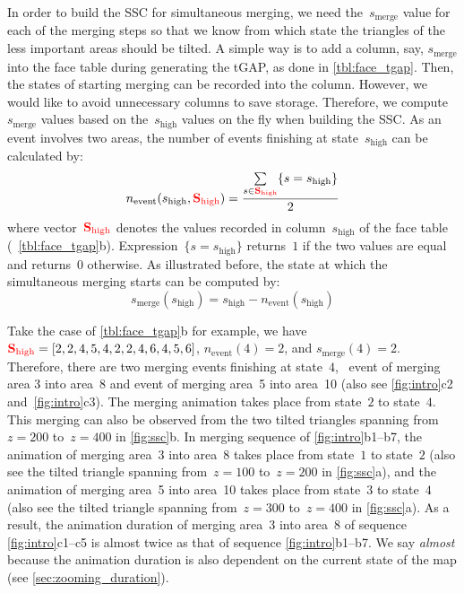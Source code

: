\documentclass[twocolumn]{svjour3}          %
\begin{document}
In order to build the SSC for simultaneous merging,
we need the~$s_\mathrm{merge}$ value for each of the merging steps
so that we know from which state 
the triangles of the less important areas should be tilted.
A simple way is to add a column, say, $s_\mathrm{merge}$
into the face table during generating the tGAP, 
as done in \tabl\ref{tbl:face_tgap}.
Then, the states of starting merging can be recorded into the column.
However, we would like to avoid unnecessary columns to save storage.
Therefore, we compute~$s_\mathrm{merge}$ values 
based on the~$s_\mathrm{high}$ values
on the fly when building the SSC.
As an event involves two areas,
the number of events finishing at state~$s_\mathrm{high}$ 
can be calculated by:
\begin{equation}
\label{eq:n_event_state}
n_\mathrm{event} (s_\mathrm{high}, {\color{red}\mathrm{\textbf{S}_{high}}}) = 
\frac{\sum\limits_{s \in {\color{red}\mathrm{\textbf{S}_{high}}}} \{s=s_\mathrm{high}\}}{2}
\end{equation}
where vector~${\color{red}\mathrm{\textbf{S}_{high}}}$ 
denotes the values
recorded in column~$s_\mathrm{high}$ of the face table
(\eg~\tabl\ref{tbl:face_tgap}b).
Expression~$\{s=s_\mathrm{high}\}$ returns~$1$ if the two values are equal 
and returns~$0$ otherwise.
As illustrated before, the state at which the simultaneous merging starts 
can be computed by:
\begin{equation}
\label{eq:s_merge_state}
s_\mathrm{merge} (s_\mathrm{high}) = 
    s_\mathrm{high} - n_\mathrm{event} (s_\mathrm{high})
\end{equation}



Take the case of \tabl\ref{tbl:face_tgap}b for example,
we have~${\color{red}\mathrm{\textbf{S}_{high}}} 
= [2, 2, 4, 5, 4, 2, 2, 4, 6, 4, 5, 6]$, 
$n_\mathrm{event} (4) = 2$, and $s_\mathrm{merge} (4) = 2$.
Therefore, there are two merging events finishing at state~$4$,
\ie~event of merging area 3 into area~8 and 
event of merging area~5 into area~10 
(also see \figs\ref{fig:intro}c2 and~\ref{fig:intro}c3).
The merging animation takes place from state~$2$ to state~$4$.
This merging can also be observed from 
the two tilted triangles spanning from~$z = 200$ to~$z = 400$ 
in \fig\ref{fig:ssc}b.
In merging sequence of \figs\ref{fig:intro}b1--b7, 
the animation of merging area~3 into area~8 
takes place from state~$1$ to state~$2$
(also see the tilted triangle spanning from~$z = 100$ to~$z = 200$ 
in \fig\ref{fig:ssc}a), and 
the animation of merging area~5 into area~10
takes place from state~$3$ to state~$4$
(also see the tilted triangle spanning from~$z = 300$ to~$z = 400$ 
in \fig\ref{fig:ssc}a).
As a result, the animation duration of merging area~3 into area~8 of 
sequence \figs\ref{fig:intro}c1--c5
is almost twice as that of sequence \figs\ref{fig:intro}b1--b7.
We say \emph{almost} because the animation duration is also dependent on 
the current state of the map
(see \sect\ref{sec:zooming_duration}).
\end{document}
